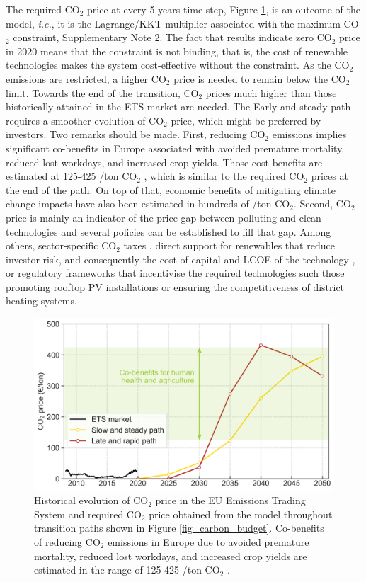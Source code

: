 \documentclass[5p]{elsarticle} %
\begin{document}
The required CO$_2$ price at every 5-years time step, Figure \ref{fig_co2price}, is an outcome of the model, \textit{i.e.}, it is the Lagrange/KKT multiplier associated with the maximum CO$_2$ constraint, Supplementary Note 2. The fact that results indicate zero CO$_2$ price in 2020 means that the constraint is not binding, that is, the cost of renewable technologies makes the system cost-effective without the constraint. As the CO$_2$ emissions are restricted, a higher CO$_2$ price is needed to remain below the CO$_2$  limit. Towards the end of the transition, CO$_2$ prices much higher than those historically attained in the ETS market are needed. The Early and steady path requires a smoother evolution of CO$_2$ price, which might be preferred by investors. Two remarks should be made. First, reducing CO$_2$ emissions implies significant co-benefits in Europe associated with avoided premature mortality, reduced lost workdays, and increased crop yields. Those cost benefits are estimated at 125-425 \EUR/ton CO$_2$ \cite{Vandyck_2018}, which is similar to the required CO$_2$ prices at the end of the path. On top of that, economic benefits of mitigating climate change impacts have also been estimated in hundreds of \EUR/ton CO$_2$. Second, CO$_2$ price is mainly an indicator of the price gap between polluting and clean technologies and several policies can be established to fill that gap. Among others, sector-specific CO$_2$ taxes \cite{Carbon_pricing_2019}, direct support for renewables that reduce investor risk, and consequently the cost of capital and LCOE of the technology \cite{Vartiainen_2019}, or regulatory frameworks that incentivise the required technologies such those promoting rooftop PV installations or ensuring the competitiveness of district heating systems. 

\begin{figure}[!h]
\centering
\includegraphics[width=\columnwidth]{../figures/co2_price.png}
\caption{Historical evolution of CO$_2$ price in the EU Emissions Trading System \cite{ETS} and required CO$_2$ price obtained from the model throughout transition paths shown in Figure \ref{fig_carbon_budget}. Co-benefits of reducing CO$_2$ emissions in Europe due to avoided premature mortality, reduced lost workdays, and increased crop yields are estimated in the range of 125-425 \EUR/ton CO$_2$ \cite{Vandyck_2018}.} \label{fig_co2price} 
\end{figure}
\end{document}
